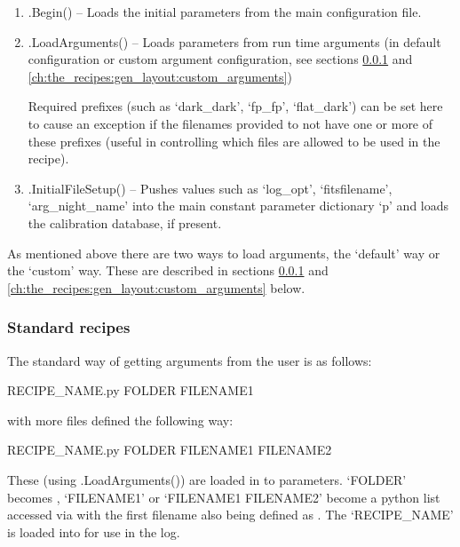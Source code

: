 \begin{enumerate}
	\item \spirouStartup.Begin() -- Loads the initial parameters from the main configuration file.

	\item \spirouStartup.LoadArguments() -- Loads parameters from run time arguments (in default configuration or custom argument configuration, see sections \ref{ch:the_recipes:gen_layout:standard_recipes} and \ref{ch:the_recipes:gen_layout:custom_arguments})
	\begin{note}
	Required prefixes (such as `dark\_dark', `fp\_fp', `flat\_dark') can be set here to cause an exception if the filenames provided to not have one or more of these prefixes (useful in controlling which files are allowed to be used in the recipe).
	\end{note}

	\item \spirouStartup.InitialFileSetup() -- Pushes values such as `log\_opt', `fitsfilename', `arg\_night\_name' into the main constant parameter dictionary `p' and loads the calibration database, if present.
\end{enumerate}

As mentioned above there are two ways to load arguments, the `default' way or the `custom' way. These are described in sections \ref{ch:the_recipes:gen_layout:standard_recipes} and \ref{ch:the_recipes:gen_layout:custom_arguments} below.

\clearpage
\newpage
\subsubsection{Standard recipes}
\label{ch:the_recipes:gen_layout:standard_recipes}

The standard way of getting arguments from the user is as follows:

\begin{cmdbox}
RECIPE_NAME.py FOLDER FILENAME1
\end{cmdbox}

\noindent with more files defined the following way:

\begin{cmdbox}
RECIPE_NAME.py FOLDER FILENAME1 FILENAME2
\end{cmdbox}

These (using \spirouStartup.LoadArguments()) are loaded in to parameters. `FOLDER' becomes , `FILENAME1' or `FILENAME1 FILENAME2' become a python list accessed via  with the first filename also being defined as . The `RECIPE\_NAME' is loaded into  for use in the log.

